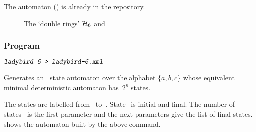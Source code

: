 The automaton  () is already in the
repository.

\begin{figure}[ht]
    \centering
\eee
{}
\caption{The `double rings' $\mathcal{H}_{6}$ and }
\label{fig:H6-app}
\end{figure}

\SetTwClPrm{\TwClOne}%


\subsubsection{Program }

\begin{SwClCmd}
\begin{shell}
$ \textsl{\texttt{ladybird 6  > ladybird-6.xml}}
$
\end{shell}%
\end{SwClCmd}%
\begin{SwClTxt}
    Generates an~ state automaton over the alphabet $\{a,b,c\}$
    whose equivalent minimal deterministic automaton has~$2^{n}$
    states.
\end{SwClTxt}%

\Spec
The
states are labelled from~ to~.
State~ is initial and final.
The number of states~ is the first parameter and the next
parameters give the list of final states.
 shows the automaton built by the above command.

